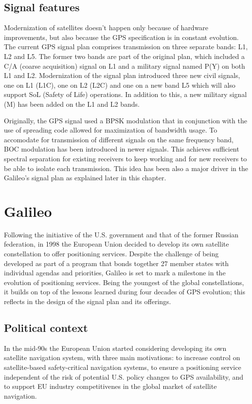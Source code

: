 \subsection{Signal features}
Modernization of satellites doesn't happen only because of hardware
improvements, but also because the GPS specification is in constant evolution.
The current GPS signal plan comprises transmission on three separate bands: L1,
L2 and L5. The former two bands are part of the original plan, which included a
C/A (coarse acquisition) signal on L1 and a military signal named P(Y) on both
L1 and L2. Modernization of the signal plan introduced three new civil signals,
one on L1 (L1C), one on L2 (L2C) and one on a new band L5 which will also
support SoL (Safety of Life) operations. In addition to this, a new military
signal (M) has been added on the L1 and L2 bands.

Originally, the GPS signal used a BPSK modulation that in conjunction with the
use of spreading code allowed for maximization of bandwidth usage. To accomodate
for transmission of different signals on the same frequency band, BOC modulation
has been introduced in newer signals. This achieves sufficient spectral
separation for existing receivers to keep working and for new receivers to be
able to isolate each transmission. This idea has been also a major driver in the
Galileo's signal plan as explained later in this chapter.

\section{Galileo}
Following the initiative of the U.S. government and that of the former Russian
federation, in 1998 the European Union decided to develop its own satellite
constellation to offer positioning services. Despite the challenge of being
developed as part of a program that bonds together 27 member states with
individual agendas and priorities, Galileo is set to mark a milestone in the
evolution of positioning services. Being the youngest of the global
constellations, it builds on top of the lessons learned during four decades of
GPS evolution; this reflects in the design of the signal plan and its offerings.

\subsection{Political context}
In the mid-90s the European Union started considering developing its own
satellite navigation system, with three main motivations: to increase control on
satellite-based safety-critical navigation systems, to ensure a positioning
service independent of the risk of potential U.S. policy changes to GPS
availability, and to support EU industry competitivenes in the global market of
satellite navigation.

